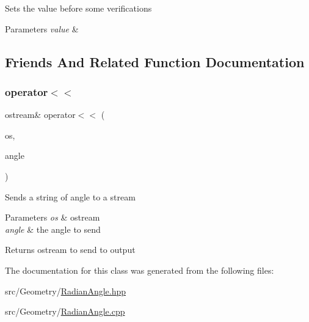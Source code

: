 Sets the value before some verifications 
\begin{DoxyParams}{Parameters}
{\em value} & \\
\hline
\end{DoxyParams}


\subsection{Friends And Related Function Documentation}
\hypertarget{class_radian_angle_a19bc64edfd90b3e701d4e9fc173162e1}{}\label{class_radian_angle_a19bc64edfd90b3e701d4e9fc173162e1} 
\subsubsection{\texorpdfstring{operator$<$$<$}{operator<<}}
{\footnotesize\ttfamily ostream\& operator$<$$<$ (\begin{DoxyParamCaption}\item[{ostream \&}]{os,  }\item[{const \hyperlink{class_radian_angle}{Radian\+Angle} \&}]{angle }\end{DoxyParamCaption})\hspace{0.3cm}{\ttfamily [friend]}}

Sends a string of angle to a stream 
\begin{DoxyParams}{Parameters}
{\em os} & ostream \\
\hline
{\em angle} & the angle to send \\
\hline
\end{DoxyParams}
\begin{DoxyReturn}{Returns}
ostream to send to output 
\end{DoxyReturn}


The documentation for this class was generated from the following files\+:\begin{DoxyCompactItemize}
\item 
src/\+Geometry/\hyperlink{_radian_angle_8hpp}{Radian\+Angle.\+hpp}\item 
src/\+Geometry/\hyperlink{_radian_angle_8cpp}{Radian\+Angle.\+cpp}\end{DoxyCompactItemize}
